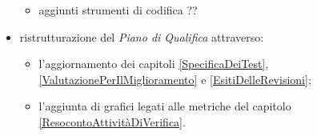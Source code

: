 \begin{itemize}
\begin{itemize}
		\item aggiunti strumenti di codifica ??
	\end{itemize}
	\item ristrutturazione del \textit{Piano di Qualifica} attraverso:
	\begin{itemize}
		\item l'aggiornamento dei capitoli \ref{SpecificaDeiTest}, \ref{ValutazionePerIlMiglioramento} e \ref{EsitiDelleRevisioni};
		\item l'aggiunta di grafici legati alle metriche del capitolo \ref{ResocontoAttivitàDiVerifica}.
	\end{itemize}
\end{itemize}